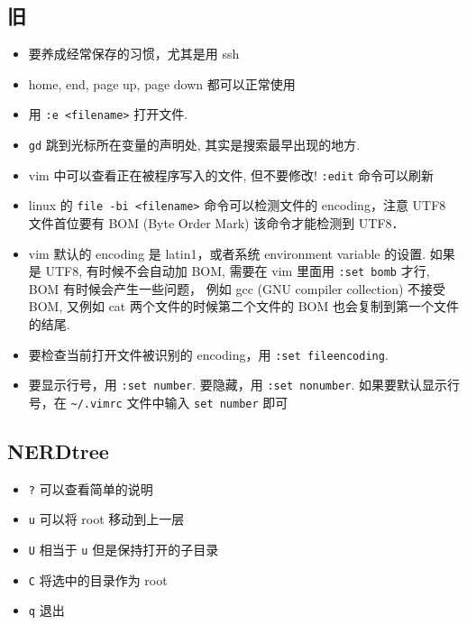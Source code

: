 \subsection{旧}
\begin{itemize}
\item 要养成经常保存的习惯，尤其是用 ssh
\item home, end, page up, page down 都可以正常使用
\item 用 \verb`:e <filename>` 打开文件.
\item \verb`gd` 跳到光标所在变量的声明处, 其实是搜索最早出现的地方.
\item vim 中可以查看正在被程序写入的文件, 但不要修改! \verb`:edit` 命令可以刷新
\item linux 的 \verb`file -bi <filename>` 命令可以检测文件的 encoding，注意 UTF8 文件首位要有 BOM (Byte Order Mark) 该命令才能检测到 UTF8．
\item vim 默认的 encoding 是 latin1，或者系统 environment variable 的设置. 如果是 UTF8, 有时候不会自动加 BOM, 需要在 vim 里面用 \verb`:set bomb` 才行, BOM 有时候会产生一些问题， 例如 gcc (GNU compiler collection) 不接受 BOM, 又例如 cat 两个文件的时候第二个文件的 BOM 也会复制到第一个文件的结尾.
\item 要检查当前打开文件被识别的 encoding，用 \verb`:set fileencoding`.
\item 要显示行号，用 \verb`:set number`. 要隐藏，用 \verb`:set nonumber`. 如果要默认显示行号，在 \verb`~/.vimrc` 文件中输入 \verb`set number` 即可
\end{itemize}

\subsection{NERDtree}
\begin{itemize}
\item \verb`?` 可以查看简单的说明
\item \verb`u` 可以将 root 移动到上一层
\item \verb`U` 相当于 \verb`u` 但是保持打开的子目录
\item \verb`C` 将选中的目录作为 root
\item \verb`q` 退出
\end{itemize}

